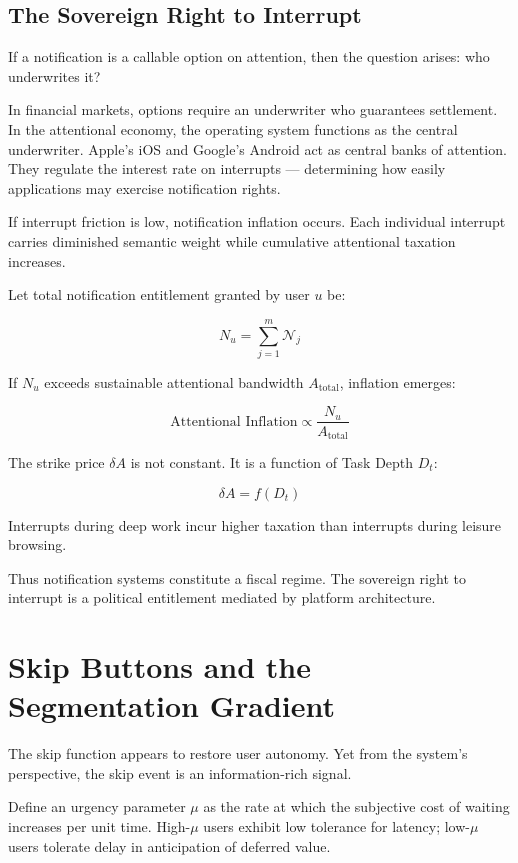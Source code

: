 \documentclass[12pt]{article}
\begin{document}
\subsection{The Sovereign Right to Interrupt}

If a notification is a callable option on attention, then the question arises: who underwrites it?

In financial markets, options require an underwriter who guarantees settlement. In the attentional economy, the operating system functions as the central underwriter. Apple’s iOS and Google’s Android act as central banks of attention. They regulate the interest rate on interrupts — determining how easily applications may exercise notification rights.

If interrupt friction is low, notification inflation occurs. Each individual interrupt carries diminished semantic weight while cumulative attentional taxation increases.

Let total notification entitlement granted by user $u$ be:

\[
N_u = \sum_{j=1}^{m} \mathcal{N}_j
\]

If $N_u$ exceeds sustainable attentional bandwidth $A_{\text{total}}$, inflation emerges:

\[
\text{Attentional Inflation} \propto \frac{N_u}{A_{\text{total}}}
\]

The strike price $\delta A$ is not constant. It is a function of Task Depth $D_t$:

\[
\delta A = f(D_t)
\]

Interrupts during deep work incur higher taxation than interrupts during leisure browsing.

Thus notification systems constitute a fiscal regime. The sovereign right to interrupt is a political entitlement mediated by platform architecture.

\section{Skip Buttons and the Segmentation Gradient}

The skip function appears to restore user autonomy. Yet from the system’s perspective, the skip event is an information-rich signal.

Define an urgency parameter $\mu$ as the rate at which the subjective cost of waiting increases per unit time. High-$\mu$ users exhibit low tolerance for latency; low-$\mu$ users tolerate delay in anticipation of deferred value.
\end{document}
